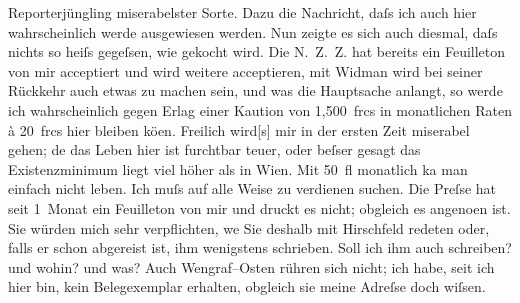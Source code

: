 \begin{ledgroupsized}[t]{13cm}
               Reporterjüngling miserabelster Sorte. Dazu die Nachricht, daſs ich auch hier
               wahrscheinlich werde ausgewiesen werden. Nun zeigte es sich auch diesmal, daſs nichts
               so heiſs gegeſsen, wie gekocht wird. Die N. Z. Z. hat bereits ein Feuilleton von mir acceptiert und wird weitere
               acceptieren, mit Widman wird bei seiner
               Rückkehr auch etwas zu machen sein, und was die Hauptsache anlangt, so werde ich
               wahrscheinlich gegen Erlag einer Kaution von 1,500 frcs in monatlichen Raten à
               20 frcs hier bleiben kö{\geminationn}en. Freilich
                  wird{[}s{]} mir in {\pb}der ersten Zeit
               miserabel gehen; de{\geminationn} das Leben hier ist furchtbar teuer,
               oder beſser gesagt das Existenzminimum liegt viel höher als in Wien. Mit 50 fl monatlich ka{\geminationn} man
               einfach nicht leben. Ich muſs auf alle Weise zu verdienen suchen. Die Preſse hat seit 1 Monat ein Feuilleton von mir und druckt es nicht;
               obgleich es angeno{\geminationm}en ist. Sie würden mich sehr
               verpflichten, we{\geminationn} Sie deshalb mit Hirschfeld redeten oder, falls er schon abgereist ist, ihm
               wenigstens schrieben. Soll ich ihm auch schreiben? und wohin? und was? Auch Wengraf–Osten rühren sich nicht; ich habe, seit ich hier bin, kein Belegexemplar erhalten, obgleich sie meine Adreſse doch wiſsen.\pend

\end{ledgroupsized}
